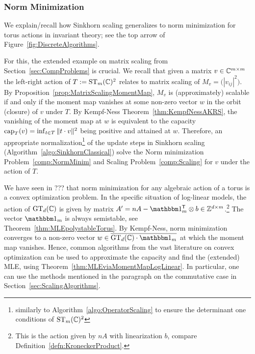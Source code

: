 \subsubsection*{Norm Minimization}

We explain/recall how Sinkhorn scaling generalizes to norm minimization for torus actions in invariant theory;
see the top arrow of Figure~\ref{fig:DiscreteAlgorithms}.

For this, the extended example on matrix scaling from Section~\ref{sec:CompProblems} is crucial. We recall that given a matrix $v \in \mathbb C^{m \times m}$ the left-right action of $T := \operatorname{ST}_m(\mathbb C)^2$ relates to matrix scaling of $M_v = \big( |v_{ij}|^2 \big)$. By Proposition~\ref{prop:MatrixScalingMomentMap}, $M_v$ is (approximately) scalable if and only if the moment map vanishes at some non-zero vector $w$ in the orbit (closure) of $v$ under $T$. By Kempf-Ness Theorem~\ref{thm:KempfNessAKRS}, the vanishing of the moment map at $w$ is equivalent to the capacity $\operatorname{cap}_T(v) = \inf_{t \in T} \|t \cdot v\|^2$ being positive and attained at $w$. Therefore, an appropriate normalization\footnote{similarly to Algorithm~\eqref{algo:OperatorScaling} to ensure the determinant one conditions of $\operatorname{ST}_m(\mathbb C)^2$}
of the update steps in Sinkhorn scaling (Algorithm~\ref{algo:SinkhornClassical}) solve the Norm minimization Problem~\ref{comp:NormMinim} and Scaling Problem~\ref{comp:Scaling} for $v$ under the action of $T$.

We have seen in ??? %
that norm minimization for any algebraic action of a torus is a convex optimization problem.
In the specific situation of log-linear models, the action of $\operatorname{GT}_d(\mathbb C)$ is given by matrix $A' = nA - \ones\T_m \otimes b \in \ZZ^{d \times m}$.\footnote{This is the action given by $nA$ with linearization $b$, compare Definition~\ref{defn:KroneckerProduct}.}
The vector $\ones_m$ is always semistable, see Theorem~\ref{thm:MLEpolystableTorus}. By Kempf-Ness, norm minimization converges to a non-zero vector $w \in \overline{\GT_d(\CC) \cdot \ones_m}$ at which the moment map vanishes. Hence, common algorithms from the vast literature on convex optimization can be used to approximate the capacity and find the (extended) MLE, using Theorem~\ref{thm:MLEviaMomentMapLogLinear}. In particular, one can use the methods mentioned in the paragraph on the commutative case in Section~\eqref{sec:ScalingAlgorithms}.
%


